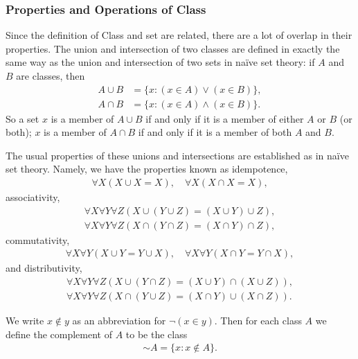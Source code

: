 \subsubsection*{Properties and Operations of Class}
Since the definition of Class and set are related, there are a lot of overlap in their properties.
The union and intersection of two classes are defined in exactly the same way as the union and intersection of two sets in naïve set theory: if \( A \) and \( B \) are classes, then
\begin{align*}
    A \cup B &= \{x : (x \in A) \vee (x \in B)\}, \\
    A \cap B &= \{x : (x \in A) \wedge (x \in B)\}.
\end{align*}
So a set \( x \) is a member of \( A \cup B \) if and only if it is a member of either \( A \) or \( B \) (or both); \( x \) is a member of \( A \cap B \) if and only if it is a member of both \( A \) and \( B \).

The usual properties of these unions and intersections are established as in naïve set theory. Namely, we have the properties known as idempotence,
\begin{align*}
    \forall X(X \cup X = X), \quad \forall X(X \cap X = X),
\end{align*}
associativity,
\begin{align*}
    \forall X \forall Y \forall Z (X \cup (Y \cup Z) = (X \cup Y) \cup Z), \\
    \forall X \forall Y \forall Z (X \cap (Y \cap Z) = (X \cap Y) \cap Z),
\end{align*}
commutativity,
\begin{align*}
    \forall X \forall Y (X \cup Y = Y \cup X), \quad \forall X \forall Y (X \cap Y = Y \cap X),
\end{align*}
and distributivity,
\begin{align*}
    \forall X \forall Y \forall Z (X \cup (Y \cap Z) = (X \cup Y) \cap (X \cup Z)), \\
    \forall X \forall Y \forall Z (X \cap (Y \cup Z) = (X \cap Y) \cup (X \cap Z)).
\end{align*}

\begin{definition}
We write \( x \notin y \) as an abbreviation for \( \neg(x \in y) \). Then for each class \( A \) we define the complement of \( A \) to be the class
\begin{align*}
    \sim A = \{x : x \notin A\}.
\end{align*}
\end{definition}

